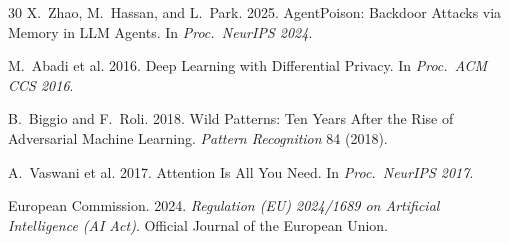 \documentclass[sigconf,nonacm]{acmart}
\begin{document}
\begin{thebibliography}{30}
X.~Zhao, M.~Hassan, and L.~Park. 2025. AgentPoison: Backdoor
Attacks via Memory in LLM Agents. In \textit{Proc.\ NeurIPS 2024}.

M.~Abadi et al. 2016. Deep Learning with Differential Privacy.
In \textit{Proc.\ ACM CCS 2016}.

B.~Biggio and F.~Roli. 2018. Wild Patterns: Ten Years After the
Rise of Adversarial Machine Learning. \textit{Pattern Recognition}
84 (2018).

A.~Vaswani et al. 2017. Attention Is All You Need.
In \textit{Proc.\ NeurIPS 2017}.

European Commission. 2024. \textit{Regulation (EU) 2024/1689 on
Artificial Intelligence (AI Act)}. Official Journal of the
European Union.

\end{thebibliography}
\end{document}
